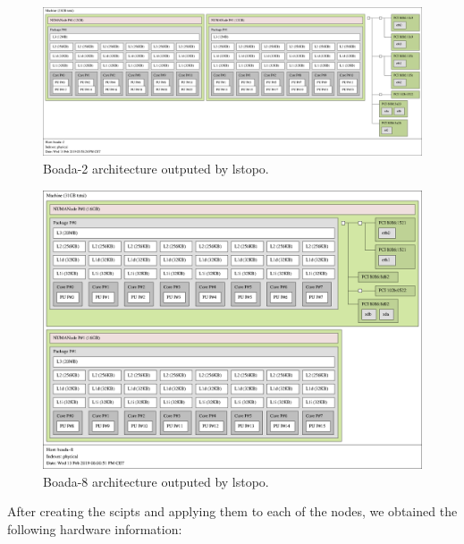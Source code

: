 \documentclass[12]{article}
\begin{document}
\begin{figure}[h]
\centering  \includegraphics[width=.8\linewidth]{map-2.png}
  \caption{Boada-2 architecture outputed by lstopo.}
  \label{fig:lstopto2}
\end{figure}

\begin{figure}[h]
\centering
  \includegraphics[width=.8\linewidth]{map-8.png}
  \caption{Boada-8 architecture outputed by lstopo.}
  \label{fig:lstopto8}
\end{figure}

After creating the scipts and applying them to each of the nodes, we obtained the following hardware information: 
\end{document}
